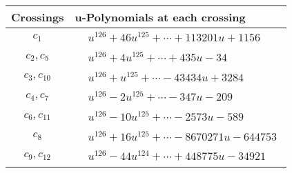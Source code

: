 \documentclass[1p]{elsarticle_modified}
\theoremstyle{definition}
\begin{document}
\begin{tabular}{m{50pt}|m{274pt}}
Crossings & \hspace{64pt}u-Polynomials at each crossing \\
\hline $$\begin{aligned}c_{1}\end{aligned}$$&$\begin{aligned}
&u^{126}+46 u^{125}+\cdots+113201 u+1156
\end{aligned}$\\
\hline $$\begin{aligned}c_{2},c_{5}\end{aligned}$$&$\begin{aligned}
&u^{126}+4 u^{125}+\cdots+435 u-34
\end{aligned}$\\
\hline $$\begin{aligned}c_{3},c_{10}\end{aligned}$$&$\begin{aligned}
&u^{126}+u^{125}+\cdots-43434 u+3284
\end{aligned}$\\
\hline $$\begin{aligned}c_{4},c_{7}\end{aligned}$$&$\begin{aligned}
&u^{126}-2 u^{125}+\cdots-347 u-209
\end{aligned}$\\
\hline $$\begin{aligned}c_{6},c_{11}\end{aligned}$$&$\begin{aligned}
&u^{126}-10 u^{125}+\cdots-2573 u-589
\end{aligned}$\\
\hline $$\begin{aligned}c_{8}\end{aligned}$$&$\begin{aligned}
&u^{126}+16 u^{125}+\cdots-8670271 u-644753
\end{aligned}$\\
\hline $$\begin{aligned}c_{9},c_{12}\end{aligned}$$&$\begin{aligned}
&u^{126}-44 u^{124}+\cdots+448775 u-34921
\end{aligned}$\\
\hline
\end{tabular}\\~\\
\end{document}
